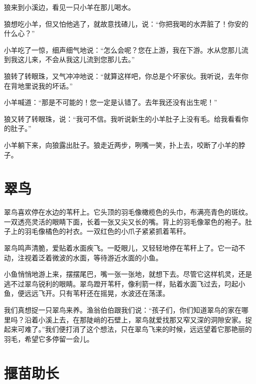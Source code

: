 \documentclass[12pt,UTF-8,openany]{ctexbook}
\begin{document}
\begin{Large}
    
    狼来到小溪边，看见一只小羊在那儿喝水。
    
    狼想吃小羊，但又怕他逃了，就故意找碴儿，说：“你把我喝的水弄脏了！你安的什么心？”
    
    小羊吃了一惊，细声细气地说：“怎么会呢？您在上游，我在下游。水从您那儿流到我这儿来，不会从我这儿流到您那儿去。”
    
    狼转了转眼珠，又气冲冲地说：“就算这样吧，你总是个坏家伙。我听说，去年你在背地里说我的坏话。”
    
    小羊喊道：“那是不可能的！您一定是认错了。去年我还没有出生呢！”
    
    狼又转了转眼珠，说：“我可不信。我听说新生的小羊肚子上没有毛。给我看看你的肚子。”
    
    小羊躺下来，向狼露出肚子。狼走近两步，咧嘴一笑，扑上去，咬断了小羊的脖子。
    
\end{Large}

\chapter{翠鸟}

\begin{Large}
    
    翠鸟喜欢停在水边的苇秆上。它头顶的羽毛像橄榄色的头巾，布满亮青色的斑纹。一双透亮灵活的眼睛下面，长着一张又尖又长的嘴。背上的羽毛像翠色的袍子。肚子上的羽毛像橘色的衬衣。一双红色的小爪子紧紧抓着苇秆。
    
    翠鸟鸣声清脆，爱贴着水面疾飞。一眨眼儿，又轻轻地停在苇秆上了。它一动不动，注视着泛着微波的水面，等待游近水面的小鱼。
    
    小鱼悄悄地游上来，摆摆尾巴，嘴一张一张地，就想下去。尽管它这样机灵，还是逃不过翠鸟锐利的眼睛。翠鸟蹬开苇秆，像利箭一样，贴着水面飞过去，叼起小鱼，便远远飞开。只有苇秆还在摇晃，水波还在荡漾。
    
    我们真想捉一只翠鸟来养。渔翁伯伯跟我们说：“孩子们，你们知道翠鸟的家在哪里吗？沿着小溪上去，在那陡峭的石壁上，翠鸟就爱找那又窄又深的洞隙安家。捉起来可难了。”我们便打消了这个想法，只在翠鸟飞来的时候，远远望着它那艳丽的羽毛，希望它多停留一会儿。
    
\end{Large}

\chapter{揠苗助长}
\end{document}
